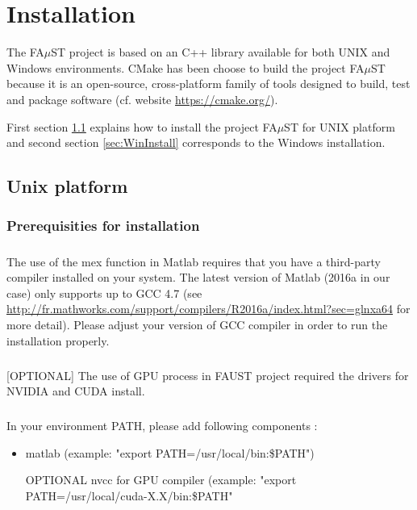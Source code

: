 \chapter{Installation}\label{sec:install}

The FA$\mu$ST project is based on an C++ library available for both UNIX and Windows environments. CMake has been choose to build the project FA$\mu$ST because it is an open-source, cross-platform family of tools designed to build, test and package software (cf. website \url{https://cmake.org/}).

First section \ref{sec:UnixInstall} explains how to install the project FA$\mu$ST for UNIX platform and second section \ref{sec:WinInstall} corresponds to the Windows installation. 

\section{Unix platform}\label{sec:UnixInstall}

\subsection{Prerequisities for installation}\label{sec:UnixPrerequisitiesInstall}
  

\paragraph{}The use of the mex function in Matlab requires that you have a third-party compiler installed on your system. The latest version of Matlab (2016a in our case) only supports up to GCC 4.7 (see \url{http://fr.mathworks.com/support/compilers/R2016a/index.html?sec=glnxa64} for more detail). Please adjust your version of GCC compiler in order to run the installation properly. 

\paragraph{}[OPTIONAL] The use of GPU process in FAUST project required the drivers for NVIDIA and CUDA install.


\paragraph{}In your environment PATH, please add following components :
\begin{itemize}
\item matlab (example: "export PATH=/usr/local/bin:\$PATH")
\item [OPTIONAL] nvcc for GPU compiler (example: "export PATH=/usr/local/cuda-X.X/bin:\$PATH"
\end{itemize}

